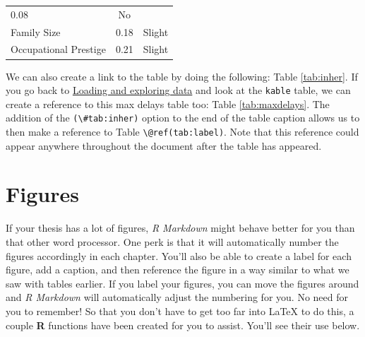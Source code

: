 \documentclass[12pt,twoside]{reedthesis}
\theoremstyle{definition}
\theoremstyle{definition}
\theoremstyle{remark}
\begin{document}
\begin{longtable}[]{@{}lcl@{}}
\begin{minipage}[t]{0.47\columnwidth}
  0.08\strut
  \end{minipage} & \begin{minipage}[t]{0.16\columnwidth}\raggedright\strut
  No\strut
  \end{minipage}\tabularnewline
  \begin{minipage}[t]{0.29\columnwidth}\raggedright\strut
  Family Size\strut
  \end{minipage} & \begin{minipage}[t]{0.47\columnwidth}\centering\strut
  0.18\strut
  \end{minipage} & \begin{minipage}[t]{0.16\columnwidth}\raggedright\strut
  Slight\strut
  \end{minipage}\tabularnewline
  \begin{minipage}[t]{0.29\columnwidth}\raggedright\strut
  Occupational Prestige\strut
  \end{minipage} & \begin{minipage}[t]{0.47\columnwidth}\centering\strut
  0.21\strut
  \end{minipage} & \begin{minipage}[t]{0.16\columnwidth}\raggedright\strut
  Slight\strut
  \end{minipage}\tabularnewline
  \bottomrule
  \end{longtable}
  
  We can also create a link to the table by doing the following: Table
  \ref{tab:inher}. If you go back to
  \protect\hyperlink{loading-and-exploring-data}{Loading and exploring
  data} and look at the \texttt{kable} table, we can create a reference to
  this max delays table too: Table \ref{tab:maxdelays}. The addition of
  the \texttt{(\textbackslash{}\#tab:inher)} option to the end of the
  table caption allows us to then make a reference to Table
  \texttt{\textbackslash{}@ref(tab:label)}. Note that this reference could
  appear anywhere throughout the document after the table has appeared.
  
  \clearpage
  
  \section{Figures}\label{figures}
  
  If your thesis has a lot of figures, \emph{R Markdown} might behave
  better for you than that other word processor. One perk is that it will
  automatically number the figures accordingly in each chapter. You'll
  also be able to create a label for each figure, add a caption, and then
  reference the figure in a way similar to what we saw with tables
  earlier. If you label your figures, you can move the figures around and
  \emph{R Markdown} will automatically adjust the numbering for you. No
  need for you to remember! So that you don't have to get too far into
  LaTeX to do this, a couple \textbf{R} functions have been created for
  you to assist. You'll see their use below.
  
\end{document}
